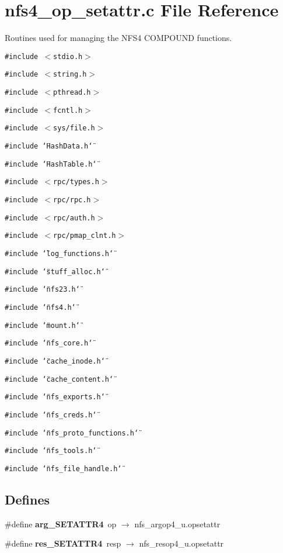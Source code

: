\section{nfs4\_\-op\_\-setattr.c File Reference}
\label{nfs4__op__setattr_8c}
Routines used for managing the NFS4 COMPOUND functions. 

{\tt \#include $<$stdio.h$>$}\par
{\tt \#include $<$string.h$>$}\par
{\tt \#include $<$pthread.h$>$}\par
{\tt \#include $<$fcntl.h$>$}\par
{\tt \#include $<$sys/file.h$>$}\par
{\tt \#include \char`\"{}Hash\-Data.h\char`\"{}}\par
{\tt \#include \char`\"{}Hash\-Table.h\char`\"{}}\par
{\tt \#include $<$rpc/types.h$>$}\par
{\tt \#include $<$rpc/rpc.h$>$}\par
{\tt \#include $<$rpc/auth.h$>$}\par
{\tt \#include $<$rpc/pmap\_\-clnt.h$>$}\par
{\tt \#include \char`\"{}log\_\-functions.h\char`\"{}}\par
{\tt \#include \char`\"{}stuff\_\-alloc.h\char`\"{}}\par
{\tt \#include \char`\"{}nfs23.h\char`\"{}}\par
{\tt \#include \char`\"{}nfs4.h\char`\"{}}\par
{\tt \#include \char`\"{}mount.h\char`\"{}}\par
{\tt \#include \char`\"{}nfs\_\-core.h\char`\"{}}\par
{\tt \#include \char`\"{}cache\_\-inode.h\char`\"{}}\par
{\tt \#include \char`\"{}cache\_\-content.h\char`\"{}}\par
{\tt \#include \char`\"{}nfs\_\-exports.h\char`\"{}}\par
{\tt \#include \char`\"{}nfs\_\-creds.h\char`\"{}}\par
{\tt \#include \char`\"{}nfs\_\-proto\_\-functions.h\char`\"{}}\par
{\tt \#include \char`\"{}nfs\_\-tools.h\char`\"{}}\par
{\tt \#include \char`\"{}nfs\_\-file\_\-handle.h\char`\"{}}\par
\subsection*{Defines}
\begin{CompactItemize}
\item 
\#define {\bf arg\_\-SETATTR4}\ op $\rightarrow$ nfs\_\-argop4\_\-u.opsetattr
\item 
\#define {\bf res\_\-SETATTR4}\ resp $\rightarrow$ nfs\_\-resop4\_\-u.opsetattr
\end{CompactItemize}
